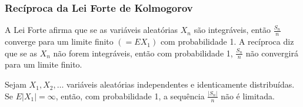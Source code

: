 \begin{frame}
\frametitle{\textbf{Recíproca da Lei Forte
de Kolmogorov}}


A Lei Forte afirma que se as variáveis aleatórias
$X_n$ são integráveis, então $\frac{S_n}{n}$ converge para um limite
finito $(=EX_1)$ com probabilidade 1. A recíproca diz que se as
$X_n$ não forem integráveis, então com probabilidade 1,
$\frac{S_n}{n}$ não convergirá para um limite finito.

\begin{teo} Sejam $X_1,X_2,\ldots$ variáveis aleatórias independentes e
identicamente distribuídas. Se $E|X_1|=\infty$, então, com
probabilidade 1, a sequência $\frac{|S_n|}{n}$ não é limitada. \end{teo}

\end{frame}

